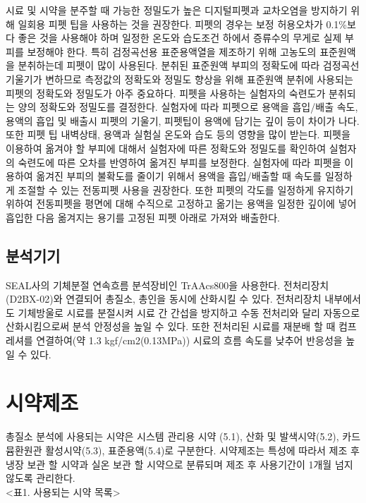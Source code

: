 \documentclass[
]{book}
\begin{document}
시료 및 시약을 분주할 때 가능한 정밀도가 높은 디지털피펫과 교차오염을 방지하기 위해 일회용 피펫 팁을 사용하는 것을 권장한다. 피펫의 경우는 보정 허용오차가 0.1\%보다 좋은 것을 사용해야 하며 일정한 온도와 습도조건 하에서 증류수의 무게로 실제 부피를 보정해야 한다. 특히 검정곡선용 표준용액열을 제조하기 위해 고농도의 표준원액을 분취하는데 피펫이 많이 사용된다. 분취된 표준원액 부피의 정확도에 따라 검정곡선 기울기가 변하므로 측정값의 정확도와 정밀도 향상을 위해 표준원액 분취에 사용되는 피펫의 정확도와 정밀도가 아주 중요하다.
피펫을 사용하는 실험자의 숙련도가 분취되는 양의 정확도와 정밀도를 결정한다. 실험자에 따라 피펫으로 용액을 흡입/배출 속도, 용액의 흡입 및 배출시 피펫의 기울기, 피펫팁이 용액에 담기는 깊이 등이 차이가 나다. 또한 피펫 팁 내벽상태, 용액과 실험실 온도와 습도 등의 영향을 많이 받는다. 피펫을 이용하여 옮겨야 할 부피에 대해서 실험자에 따른 정확도와 정밀도를 확인하여 실험자의 숙련도에 따른 오차를 반영하여 옮겨진 부피를 보정한다. 실험자에 따라 피펫을 이용하여 옮겨진 부피의 불확도를 줄이기 위해서 용액을 흡입/배출할 때 속도를 일정하게 조절할 수 있는 전동피펫 사용을 권장한다. 또한 피펫의 각도를 일정하게 유지하기 위하여 전동피펫을 평면에 대해 수직으로 고정하고 옮기는 용액을 일정한 깊이에 넣어 흡입한 다음 옮겨지는 용기를 고정된 피펫 아래로 가져와 배출한다.

\hypertarget{uxbd84uxc11duxae30uxae30-1}{%
\subsection{분석기기}\label{uxbd84uxc11duxae30uxae30-1}}

SEAL사의 기체분절 연속흐름 분석장비인 TrAAcs800을 사용한다. 전처리장치(D2BX-02)와 연결되어 총질소, 총인을 동시에 산화시킬 수 있다. 전처리장치 내부에서도 기체방울로 시료를 분절시켜 시료 간 간섭을 방지하고 수동 전처리와 달리 자동으로 산화시킴으로써 분석 안정성을 높일 수 있다. 또한 전처리된 시료를 재분배 할 때 컴프레셔를 연결하여(약 1.3 kgf/cm2(0.13MPa)) 시료의 흐름 속도를 낮추어 반응성을 높일 수 있다.

\hypertarget{uxc2dcuxc57duxc81cuxc870-2}{%
\section{시약제조}\label{uxc2dcuxc57duxc81cuxc870-2}}

총질소 분석에 사용되는 시약은 시스템 관리용 시약 (5.1), 산화 및 발색시약(5.2), 카드뮴환원관 활성시약(5.3), 표준용액(5.4)로 구분한다. 시약제조는 특성에 따라서 제조 후 냉장 보관 할 시약과 실온 보관 할 시약으로 분류되며 제조 후 사용기간이 1개월 넘지 않도록 관리한다.\\
\textless 표1. 사용되는 시약 목록\textgreater{}
\end{document}
